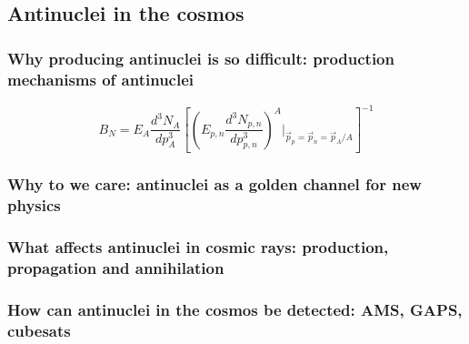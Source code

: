 \subsection{Antinuclei in the cosmos}

\subsubsection{ Why producing antinuclei is so difficult: production mechanisms of antinuclei}\label{sec:IntroProductionAntinuclei}
\begin{equation}\label{eq:CoalescenceParameter}
    B_N = E_A \frac{d^3 N_A}{dp^3_A} \left[ \left( E_{p,n} \frac{d^3 N_{p,n}}{dp^3_{p,n}} \right)^A |_{\vec{p}_p=\vec{p}_n=\vec{p}_A/A } \right]^{-1}
\end{equation}
\subsubsection{ Why to we care: antinuclei as a golden channel for new physics}
\subsubsection{ What affects antinuclei in cosmic rays: production, propagation and annihilation}
\subsubsection{ How can antinuclei in the cosmos be detected: AMS, GAPS, cubesats}
